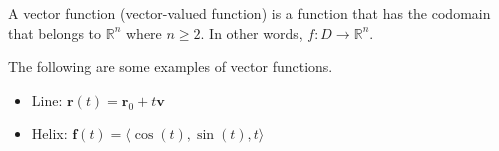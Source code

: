 \documentclass[aspectratio=169]{beamer}
\newcommand{\vect}{\mathbf}
\newcommand{\R}{\mathbb{R}}
\begin{document}
\begin{frame}
    \frametitle{\secname}
\begin{definition}
A vector function (vector-valued function) is a function that has the codomain that belongs to $\R^n$ where $n\geq 2$. In other words, $f: D  \to \R^n$.
\end{definition}

\begin{example}
The following are some examples of vector functions.

\begin{itemize}
    \item  Line: $\vect{r}(t) = \vect{r}_0 + t\vect{v}$
    \item  Helix: $\vect{f}(t) = \langle \cos(t),\sin(t), t \rangle$
\end{itemize}
\end{example}
\end{frame}
\end{document}
